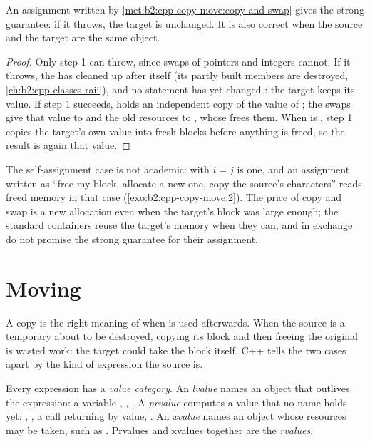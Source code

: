 \begin{proposition}\label{prop:b2:cpp-copy-move:copy-and-swap}
An assignment written by \cref{met:b2:cpp-copy-move:copy-and-swap} gives the strong guarantee: if it throws, the
target is unchanged. It is also correct when the source and the target are the same object.
\end{proposition}

\begin{proof}
Only step 1 can throw, since swaps of pointers and integers cannot. If it throws, the  has cleaned
up after itself (its partly built members are destroyed, \cref{ch:b2:cpp-classes-raii}), and no statement has yet
changed : the target keeps its value. If step 1 succeeds,  holds an independent copy of the
value of ; the swaps give that value to  and the old resources to , whose 
frees them. When  is , step 1 copies the target's own value into fresh blocks before anything is
freed, so the result is again that value.
\end{proof}

The self-assignment case is not academic:  with $i = j$ is one, and an assignment written as
``free my block, allocate a new one, copy the source's characters'' reads freed memory in that case
(\cref{exo:b2:cpp-copy-move:2}). The price of copy and swap is a new allocation even when the target's block was
large enough; the standard containers reuse the target's memory when they can, and in exchange do not promise the
strong guarantee for their assignment.

\section{Moving}\label{sec:b2:cpp-copy-move:moving}

A copy is the right meaning of  when  is used afterwards. When the source is a temporary about
to be destroyed, copying its block and then freeing the original is wasted work: the target could take the block
itself. C++ tells the two cases apart by the kind of expression the source is.

\begin{definition}\label{def:b2:cpp-copy-move:rvalue}
Every expression has a \emph{value category}. An \emph{lvalue} names an object
that outlives the expression: a variable , , . A \emph{prvalue} computes a value that no
name holds yet: , , a call  returning by value, . An
\emph{xvalue} names an object whose resources may be taken, such as . Prvalues and xvalues together
are the \emph{rvalues}.
\end{definition}

